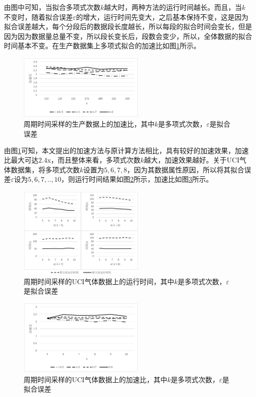 由图中可知，当拟合多项式次数$k$越大时，两种方法的运行时间越长。而且，当$k$不变时，随着拟合误差$\varepsilon$的增大，运行时间先变大，之后基本保持不变，这是因为拟合误差越大，每个分段后的数据段长度越长，所以每段的拟合时间会变长，但是因为因为数据量总量不变，所以段长变长后，段数会变少，所以，全体数据的拟合时间基本不变。在生产数据集上多项式拟合的加速比如图\ref{fig:fig622}所示。

\begin{figure}[htb]
	\centering
	\includegraphics[width=0.55\textwidth]{figures/figure62x2product}
	\caption{周期时间采样的生产数据上的加速比，其中$k$是多项式次数，$\varepsilon$是拟合误差}\label{fig:fig622}
\end{figure}

由图\ref{fig:fig622}可知，本文提出的加速方法与原计算方法相比，具有较好的加速效果，加速比最大可达$2.4$x，而且整体来看，多项式次数$k$越大，加速效果越好。关于UCI气体数据集，将多项式次数$k$设置为$5,6,7,8$，因为其数据属性原因，所以将其拟合误差$\varepsilon$设为$5,6,7,..,10$，则运行时间结果如图\ref{fig:fig623}所示，加速比如图\ref{fig:fig624}所示。

\begin{figure}[htb]
	\centering
	\includegraphics[width=0.55\textwidth]{figures/figure62x3gas}
	\caption{周期时间采样的UCI气体数据上的运行时间，其中$k$是多项式次数，$\varepsilon$是拟合误差}\label{fig:fig623}
\end{figure}

\begin{figure}[htb]
	\centering
	\includegraphics[width=0.55\textwidth]{figures/figure62x4gas}
	\caption{周期时间采样的UCI气体数据上的加速比，其中$k$是多项式次数，$\varepsilon$是拟合误差}\label{fig:fig624}
\end{figure}

